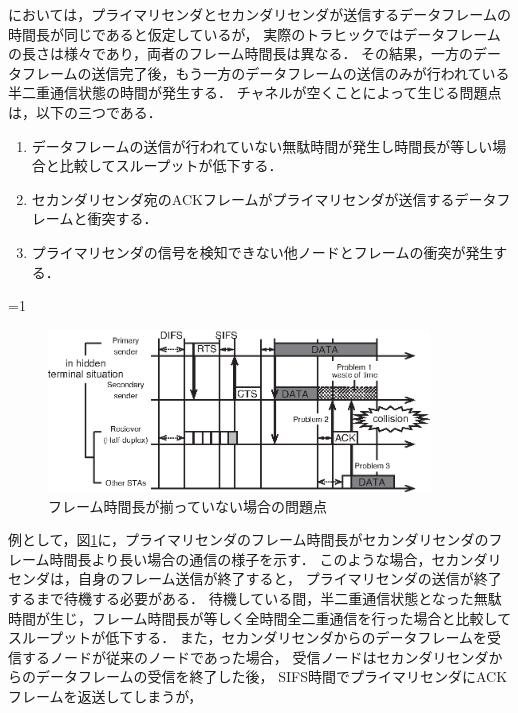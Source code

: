 \documentclass[master]{kuisthesis}		%
\newcounter{flagFig}
\begin{document}
			\par
			\cite{fdmac}においては，プライマリセンダとセカンダリセンダが送信するデータフレームの時間長が同じであると仮定しているが，
			実際のトラヒックではデータフレームの長さは様々であり，両者のフレーム時間長は異なる．
			その結果，一方のデータフレームの送信完了後，もう一方のデータフレームの送信のみが行われている半二重通信状態の時間が発生する．
			チャネルが空くことによって生じる問題点は，以下の三つである．
			\begin{enumerate}
				\item データフレームの送信が行われていない無駄時間が発生し時間長が等しい場合と比較してスループットが低下する．
			 	\item セカンダリセンダ宛のACKフレームがプライマリセンダが送信するデータフレームと衝突する．
			 	\item プライマリセンダの信号を検知できない他ノードとフレームの衝突が発生する．
			\end{enumerate}
			\par
			\ifnum\value{flagFig}=1 {\begin{figure}[htbp]
				\begin{center}
					\includegraphics[width=0.9\textwidth]{fig/relay_not_equal2.eps}
					\caption{フレーム時間長が揃っていない場合の問題点}
					\label{fig:not_equal}
				\end{center}
			\end{figure}}\fi
			例として，図\ref{fig:not_equal}に，プライマリセンダのフレーム時間長がセカンダリセンダのフレーム時間長より長い場合の通信の様子を示す．
			このような場合，セカンダリセンダは，自身のフレーム送信が終了すると，
			プライマリセンダの送信が終了するまで待機する必要がある．
			待機している間，半二重通信状態となった無駄時間が生じ，フレーム時間長が等しく全時間全二重通信を行った場合と比較してスループットが低下する．
			また，セカンダリセンダからのデータフレームを受信するノードが従来のノードであった場合，
			受信ノードはセカンダリセンダからのデータフレームの受信を終了した後，
			SIFS時間でプライマリセンダにACKフレームを返送してしまうが，
\end{document}
